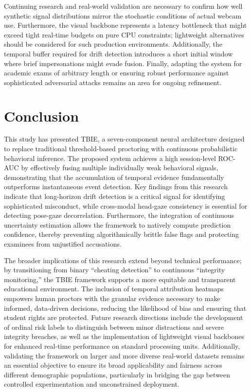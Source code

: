 \documentclass[journal]{IEEEtran}
\begin{document}
Continuing research and real-world validation are necessary to confirm how well synthetic signal distributions mirror the stochastic conditions of actual webcam use. Furthermore, the visual backbone represents a latency bottleneck that might exceed tight real-time budgets on pure CPU constraints; lightweight alternatives should be considered for such production environments. Additionally, the temporal buffer required for drift detection introduces a short initial window where brief impersonations might evade fusion. Finally, adapting the system for academic exams of arbitrary length or ensuring robust performance against sophisticated adversarial attacks remains an area for ongoing refinement.


\section{Conclusion}
\label{sec:conclusion}

This study has presented TBIE, a seven-component neural architecture designed to replace traditional threshold-based proctoring with continuous probabilistic behavioral inference. The proposed system achieves a high session-level ROC-AUC by effectively fusing multiple individually weak behavioral signals, demonstrating that the accumulation of temporal evidence fundamentally outperforms instantaneous event detection. Key findings from this research indicate that long-horizon drift detection is a critical signal for identifying sophisticated misconduct, while cross-modal head-gaze consistency is essential for detecting pose-gaze decorrelation. Furthermore, the integration of continuous uncertainty estimation allows the framework to natively compute prediction confidence, thereby preventing algorithmically brittle false flags and protecting examinees from unjustified accusations. 

The broader implications of this research extend beyond technical performance; by transitioning from binary ``cheating detection'' to continuous ``integrity monitoring,'' the TBIE framework supports a more equitable and transparent educational environment. The inclusion of temporal attribution heatmaps empowers human proctors with the granular evidence necessary to make informed, data-driven decisions, reducing the likelihood of bias and ensuring that student rights are protected. Future research directions include the development of ordinal risk labels to distinguish between minor distractions and severe integrity breaches, as well as the implementation of lightweight visual backbones for enhanced real-time performance on standard processing units. Additionally, validating the framework on larger and more diverse real-world datasets remains an essential objective to ensure its broad applicability and fairness across different demographic populations, particularly in bridging the gap between controlled experimentation and unconstrained deployment.
\end{document}
